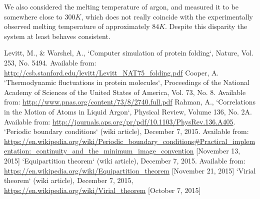 \documentclass[a4paper]{article}
\begin{document}
We also considered the melting temperature of argon, and measured it to be
somewhere close to $300K$, which does not really coincide with the
experimentally observed melting temperature of approximately $84K$. Despite
this disparity the system at least behaves consistent. 


\begin{thebibliography}{9}
    Levitt, M., \& Warshel, A., `Computer simulation of protein folding`, Nature, Vol. 253, No. 5494. Available from: \url{http://csb.stanford.edu/levitt/Levitt_NAT75_folding.pdf}
    Cooper, A. `Thermodynamic fluctuations in protein molecules`, Proceedings of the National Academy of Sciences of the United States of America, Vol. 73, No. 8. Available from: \url{http://www.pnas.org/content/73/8/2740.full.pdf}
    Rahman, A., `Correlations in the Motion of Atoms in Liquid Argon`, Physical Review, Volume 136, No. 2A. Available from: \url{http://journals.aps.org/pr/pdf/10.1103/PhysRev.136.A405}.
    `Periodic boundary conditions` (wiki article), December 7, 2015. Available from: \url{https://en.wikipedia.org/wiki/Periodic_boundary_conditions#Practical_implementation:_continuity_and_the_minimum_image_convention} [November 13, 2015]
    `Equipartition theorem` (wiki article), December 7, 2015.
    Available from: \url{https://en.wikipedia.org/wiki/Equipartition\_theorem} [November 21, 2015]
    `Virial theorem` (wiki article), December 7, 2015, \url{https://en.wikipedia.org/wiki/Virial_theorem} [October 7, 2015]
\end{thebibliography}
\end{document}
